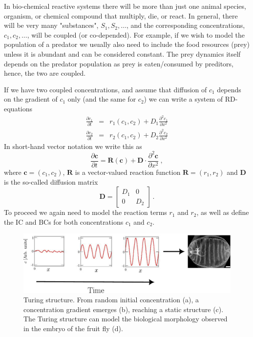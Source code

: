 \begin{example}
	\label{example:turing}
	In bio-chemical reactive systems there will be more than just one animal species,
	organism, or chemical compound that multiply, die, or react. In general, there will
	be very many "substances", $S_1, S_2, \ldots$, and the corresponding 
	concentrations, $c_1, c_2, \ldots$,  will be coupled (or co-depended).
	For example, if we wish to model the population of a predator we
	usually also need to include the food resources (prey) unless it is abundant and can be considered 
	constant. The prey dynamics itself depends on the predator population as prey is eaten/consumed 
	by preditors, hence, the two are coupled.

	If we have two coupled concentrations, and assume that diffusion of $c_1$ depends on the gradient 
	of $c_1$ only (and the same for $c_2$) we can write a system of RD-equations 
	\begin{eqnarray}
		\frac{\partial c_1}{\partial t} &=& r_1(c_1,c_2) + D_1 \frac{\partial^2
		c_1}{\partial x^2} \\
		\frac{\partial c_2}{\partial t} &=& r_2(c_1,c_2) + D_2 \frac{\partial^2
		c_2}{\partial x^2} 
	\end{eqnarray}
	In short-hand vector notation we write this as 
	\begin{equation}
		\frac{\partial \mathbf{c}}{\partial t} = \mathbf{R}(\mathbf{c}) + \mathbf{D}
		\cdot \frac{\partial^2 \mathbf{c}}{\partial x^2} \ ,
	\end{equation}
	where $\mathbf{c}=(c_1, c_2)$, $\mathbf{R}$ is a vector-valued reaction function 
	$\mathbf{R} = (r_1, r_2)$ and $\mathbf{D}$ is the so-called diffusion
	matrix
	\begin{equation}
		\mathbf{D} =
		\begin{bmatrix}
			D_1 & 0 \\
			0 & D_2 
		\end{bmatrix} \, .
	\end{equation}
	To proceed we again need to model the reaction terms $r_1$ and $r_2$, as well
	as define the IC and BCs for both concentrations $c_1$ and $c_2$.

	\begin{figure}[t]
		\begin{center}
			\includegraphics[scale=0.6]{figs/turingIllustration.pdf}
			\caption{\label{fig:turing} Turing structure. From random initial
			concentration (a), a concentration gradient emerges (b), reaching a
			static structure (c).  The Turing structure can model the 
			biological morphology observed in the embryo of the fruit fly (d).  }
		\end{center}
	\end{figure}


\end{example}
